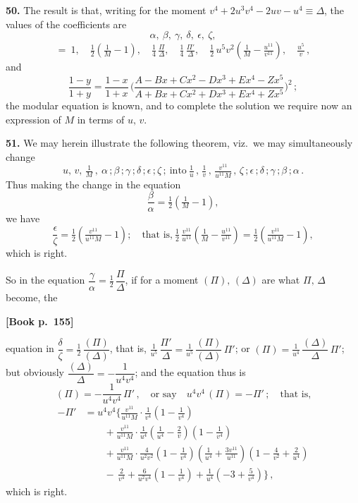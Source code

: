 \documentclass[11pt]{article}
\begin{document}
\medskip

\textbf{50.} The result is that, writing for the moment $v^4 + 2u^3 v^4 - 2uv - u^4 \equiv \Delta$, the values of the coefficients are
\[
\alpha,\ \beta,\ \gamma,\ \delta,\ \epsilon,\ \zeta,
\]
\[
=\ 1,\quad \tfrac{1}{2}\!\left(\tfrac{1}{M}-1\right),\quad \tfrac{1}{4}\,\tfrac{\Pi}{\Delta},\quad \tfrac{1}{4}\,\tfrac{\Pi'}{\Delta},\quad \tfrac{1}{2}\,u^5 v^2\!\left(\tfrac{1}{M}-\tfrac{u^{11}}{v^{11}}\right),\quad \tfrac{u^5}{v}\,,
\]
and
\[
\frac{1-y}{1+y} = \frac{1-x}{1+x}\,\biggl(\frac{A - Bx + Cx^2 - Dx^3 + Ex^4 - Zx^5}{A + Bx + Cx^2 + Dx^3 + Ex^4 + Zx^5}\biggr)^{\!2}\,;
\]
the modular equation is known, and to complete the solution we require now an
expression of $M$ in terms of $u,\,v$.

\medskip

\textbf{51.} We may herein illustrate the following theorem, viz.\ we may simultaneously
change
\[
u,\,v,\,\tfrac{1}{M}\,,\ \alpha\,;\beta\,;\gamma\,;\delta\,;\epsilon\,;\zeta\,;\ \text{into}\ \tfrac{1}{u}\,,\,\tfrac{1}{v}\,,\,\tfrac{v^{11}}{u^{11}M}\,,\,\zeta\,;\epsilon\,;\delta\,;\gamma\,;\beta\,;\alpha\,.
\]
Thus making the change in the equation
\[
\frac{\beta}{\alpha} = \tfrac{1}{2}\!\left(\tfrac{1}{M} - 1\right),
\]
we have
\[
\frac{\epsilon}{\zeta} = \tfrac{1}{2}\!\left(\tfrac{v^{11}}{u^{11}M} - 1\right);\quad
\text{that is,}\ \tfrac{1}{2}\,\tfrac{v^{11}}{u^{11}}\!\left(\tfrac{1}{M} - \tfrac{u^{11}}{v^{11}}\right)
=\tfrac{1}{2}\!\left(\tfrac{v^{11}}{u^{11}M} - 1\right),
\]
which is right.

So in the equation $\dfrac{\gamma}{\alpha}=\tfrac{1}{2}\,\dfrac{\Pi}{\Delta}$, if for a
moment $(\Pi),\,(\Delta)$ are what $\Pi,\,\Delta$ become, the

\bigskip

\noindent\textbf{[Book p.~155]}

\medskip

\noindent
equation in $\dfrac{\delta}{\zeta}=\tfrac{1}{2}\,\dfrac{(\Pi)}{(\Delta)}$, that is,
$\tfrac{1}{u^5}\,\dfrac{\Pi'}{\Delta}=\tfrac{1}{u^5}\,\dfrac{(\Pi)}{(\Delta)}\,\Pi'$; or
$(\Pi)=\tfrac{1}{u^4}\,\dfrac{(\Delta)}{\Delta}\,\Pi'$; but obviously
$\dfrac{(\Delta)}{\Delta}=-\dfrac{1}{u^4 v^4}$; and the equation thus is
\[
(\Pi)=-\dfrac{1}{u^4 v^4}\,\Pi'\,,
\quad\text{or say}\quad u^4 v^4\,(\Pi)=-\Pi'\,;\quad\text{that is,}
\]
\begin{align*}
-\Pi' &= u^4 v^4\biggl\{\frac{v^{11}}{u^{11} M}\cdot\frac{1}{v^4}\!\left(1-\frac{1}{v^4}\right)\\
&\qquad + \frac{v^{11}}{u^{11} M}\cdot\frac{1}{u^4}\!\left(\frac{1}{u^4}-\frac{2}{v}\right)\!\left(1-\frac{1}{v^4}\right)\\
&\qquad + \frac{v^{11}}{u^{11} M}\cdot\frac{4}{u^2 v^2}\!\left(1-\frac{1}{v^4}\right)\!\left(\frac{1}{u^4}+\frac{3v^{11}}{u^{11}}\right)\!\left(1-\frac{4}{v^2}+\frac{2}{u^4}\right)\\
&\qquad -\,\frac{2}{v^4}+\frac{6}{u^2 v^4}\!\left(1-\frac{1}{v^4}\right)+\frac{1}{u^4}\!\left(-3+\frac{5}{v^4}\right)\biggr\}\,,
\end{align*}
which is right.
\end{document}
